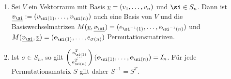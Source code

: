\documentclass[../../main.tex]{subfiles}
\begin{document}
\begin{bem}\label{13.5.6}
	\begin{enumerate}[\normalfont(a)]
		\item Sei $V$ ein Vektorraum mit Basis ${\underline v}=(v_1,\ldots ,v_n)$ und $\si\in S_n$. Dann ist $\underline{v_{\si}}:=(v_{\si(1)},\ldots ,v_{\si(n)})$ auch eine Basis von $V$ und die Basiswechselmatrizen $M(\underline{v},\underline{v_{\si}})=(e_{\si^{-1}(1)},\ldots ,e_{\si^{-1}(n)})$ und $M(\underline{v_{\si}},\v)=(e_{\si^{}(1)},\ldots ,e_{\sigma^{}(n)})$ Permutationsmatrizen.
		\item Ist $\sigma\in S_n$, so gilt $\cvec{e^T_{\si(1)}\\\ldots \\ e^T_{\si(n)}}(e_{\si(1)},\ldots ,e_{\si(n)})=I_n$. Für jede Permutationsmatrix $S$ gilt daher $S^{-1}=S^T$.
	\end{enumerate}
\end{bem}
\end{document}
